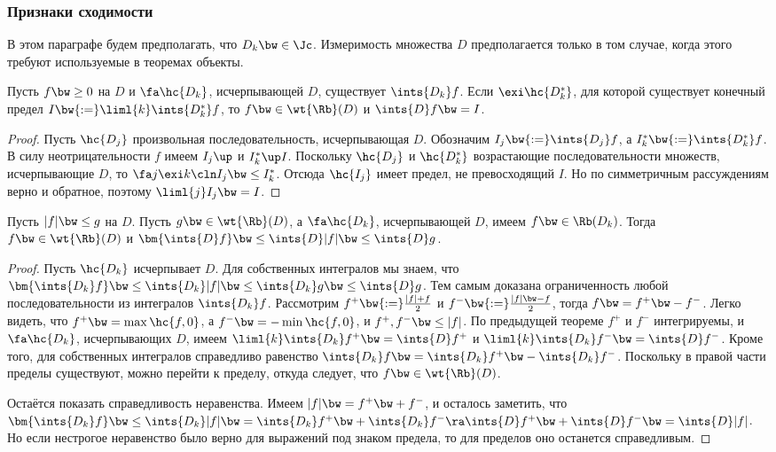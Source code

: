 \documentclass[a4paper]{article}
\newcommand{\Rbt}{\wt{\Rb}}
\begin{document}
\subsubsection{Признаки сходимости}

В этом параграфе будем предполагать, что $D_k \bw\in \Jc$. Измеримость множества $D$ предполагается
только в том случае, когда этого требуют используемые в теоремах объекты.

\begin{theorem}
Пусть $f \bw\ge 0$ на $D$ и $\fa \hc{D_k}$, исчерпывающей $D$, существует $\ints{D_k} f$. Если
$\exi \hc{D_k^*}$, для которой существует конечный предел $I \bw{:=} \liml{k} \ints{D_k^*} f$, то
$f \bw\in \Rbt(D)$ и $\ints{D}f \bw= I$.
\end{theorem}
\begin{proof}
Пусть $\hc{D_j}$ произвольная последовательность, исчерпывающая $D$. Обозначим $I_j \bw{:=}
\ints{D_j} f$, а $I_k^* \bw{:=} \ints{D_k^*}f$. В силу неотрицательности $f$ имеем $I_j \up$ и
$I_k^* \up I$. Поскольку $\hc{D_j}$ и $\hc{D_k^*}$ возрастающие последовательности
множеств, исчерпывающие $D$, то $\fa j \exi k\cln I_j \bw\le I_k^*$. Отсюда $\hc{I_j}$ имеет предел, не
превосходящий $I$. Но по симметричным рассуждениям верно и обратное, поэтому $\liml{j} I_j \bw= I$.
\end{proof}

\begin{theorem}
Пусть $|f|\bw\le g$ на $D$. Пусть $g \bw\in \Rbt(D)$, а $\fa \hc{D_k}$, исчерпывающей $D$, имеем $f \bw\in
\Rb(D_k)$. Тогда $f \bw\in \Rbt(D)$ и $\bm{\ints{D}f} \bw\le \ints{D} |f|\bw\le \ints{D} g$.
\end{theorem}
\begin{proof}
Пусть $\hc{D_k}$ исчерпывает $D$. Для собственных интегралов мы знаем, что $\bm{\ints{D_k}f} \bw\le
\ints{D_k} |f| \bw\le \ints{D_k} g \bw\le \ints{D} g$. Тем самым доказана ограниченность любой
последовательности из интегралов $\ints{D_k} f$. Рассмотрим $f^+ \bw{:=} \frac{|f| + f}{2}$ и $f^-
\bw{:=} \frac{|f| \bw- f}{2}$, тогда $f \bw= f^+ \bw- f^-$. Легко видеть, что $f^+ \bw= \max\hc{f,
0}$, а $f^- \bw= -\min\hc{f, 0}$, и $f^+, f^- \bw\le |f|$. По предыдущей теореме $f^+$ и $f^-$
интегрируемы, и $\fa \hc{D_k}$, исчерпывающих $D$, имеем $\liml{k} \ints{D_k} f^+ \bw= \ints{D}
f^+$ и $\liml{k} \ints{D_k} f^- \bw= \ints{D} f^-$. Кроме того, для собственных интегралов
справедливо равенство $\ints{D_k} f \bw= \ints{D_k} f^+ \bw- \ints{D_k} f^-$. Поскольку в правой
части пределы существуют, можно перейти к пределу, откуда следует, что $f \bw\in \Rbt(D)$.

Остаётся показать справедливость неравенства. Имеем $|f| \bw= f^+ \bw+ f^-$, и осталось заметить, что
$\bm{\ints{D_k} f} \bw\le \ints{D_k}|f| \bw= \ints{D_k} f^+ \bw+ \ints{D_k} f^- \ra \ints{D} f^+ \bw+ \ints{D}
f^- \bw= \ints{D} |f|$. Но если нестрогое неравенство было верно для выражений под знаком предела, то
для пределов оно останется справедливым.
\end{proof}
\end{document}
